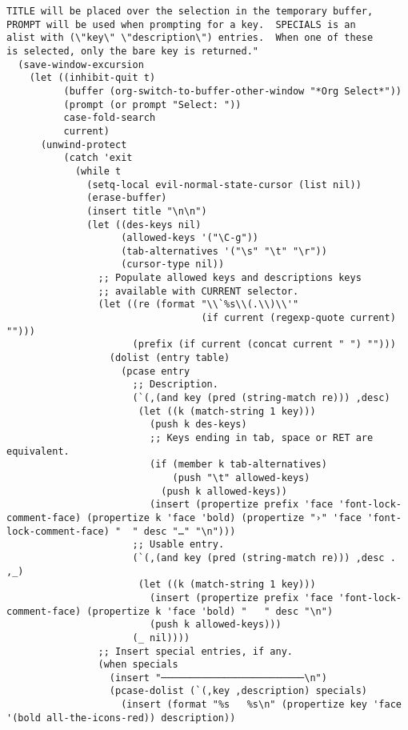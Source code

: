 \documentclass[c]{article}
\theoremstyle{plain}%
\theoremstyle{definition}
\theoremstyle{remark}
\begin{document}
\begin{verbatim}
TITLE will be placed over the selection in the temporary buffer,
PROMPT will be used when prompting for a key.  SPECIALS is an
alist with (\"key\" \"description\") entries.  When one of these
is selected, only the bare key is returned."
  (save-window-excursion
    (let ((inhibit-quit t)
          (buffer (org-switch-to-buffer-other-window "*Org Select*"))
          (prompt (or prompt "Select: "))
          case-fold-search
          current)
      (unwind-protect
          (catch 'exit
            (while t
              (setq-local evil-normal-state-cursor (list nil))
              (erase-buffer)
              (insert title "\n\n")
              (let ((des-keys nil)
                    (allowed-keys '("\C-g"))
                    (tab-alternatives '("\s" "\t" "\r"))
                    (cursor-type nil))
                ;; Populate allowed keys and descriptions keys
                ;; available with CURRENT selector.
                (let ((re (format "\\`%s\\(.\\)\\'"
                                  (if current (regexp-quote current) "")))
                      (prefix (if current (concat current " ") "")))
                  (dolist (entry table)
                    (pcase entry
                      ;; Description.
                      (`(,(and key (pred (string-match re))) ,desc)
                       (let ((k (match-string 1 key)))
                         (push k des-keys)
                         ;; Keys ending in tab, space or RET are equivalent.
                         (if (member k tab-alternatives)
                             (push "\t" allowed-keys)
                           (push k allowed-keys))
                         (insert (propertize prefix 'face 'font-lock-comment-face) (propertize k 'face 'bold) (propertize "›" 'face 'font-lock-comment-face) "  " desc "…" "\n")))
                      ;; Usable entry.
                      (`(,(and key (pred (string-match re))) ,desc . ,_)
                       (let ((k (match-string 1 key)))
                         (insert (propertize prefix 'face 'font-lock-comment-face) (propertize k 'face 'bold) "   " desc "\n")
                         (push k allowed-keys)))
                      (_ nil))))
                ;; Insert special entries, if any.
                (when specials
                  (insert "─────────────────────────\n")
                  (pcase-dolist (`(,key ,description) specials)
                    (insert (format "%s   %s\n" (propertize key 'face '(bold all-the-icons-red)) description))

\end{verbatim}
\end{document}

